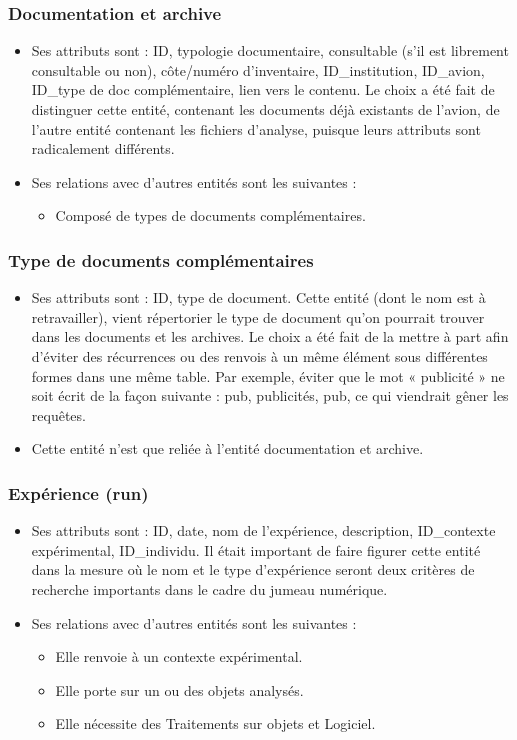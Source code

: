 \subsubsection{Documentation et archive}
\begin{itemize}
    \item Ses attributs sont : ID, typologie documentaire, consultable (s’il est librement consultable ou non), côte/numéro d’inventaire, ID\_institution, ID\_avion, ID\_type de doc complémentaire, lien vers le contenu. Le choix a été fait de distinguer cette entité, contenant les documents déjà existants de l’avion, de l’autre entité contenant les fichiers d’analyse, puisque leurs attributs sont radicalement différents.
    \item Ses relations avec d’autres entités sont les suivantes :
    \begin{itemize}
        \item Composé de types de documents complémentaires.
    \end{itemize}
\end{itemize}
\subsubsection{Type de documents complémentaires}
\begin{itemize}
    \item Ses attributs sont : ID, type de document. Cette entité (dont le nom est à retravailler), vient répertorier le type de document qu’on pourrait trouver dans les documents et les archives. Le choix a été fait de la mettre à part afin d’éviter des récurrences ou des renvois à un même élément sous différentes formes dans une même table. Par exemple, éviter que le mot « publicité » ne soit écrit de la façon suivante : pub, publicités, pub, ce qui viendrait gêner les requêtes.
    \item Cette entité n’est que reliée à l’entité documentation et archive.
\end{itemize}
\subsubsection{Expérience (run)}
\begin{itemize}
    \item Ses attributs sont : ID, date, nom de l'expérience, description, ID\_contexte expérimental, ID\_individu. Il était important de faire figurer cette entité dans la mesure où le nom et le type d’expérience seront deux critères de recherche importants dans le cadre du jumeau numérique.
    \item Ses relations avec d’autres entités sont les suivantes :
    \begin{itemize}
        \item Elle renvoie à un contexte expérimental.
        \item Elle porte sur un ou des objets analysés.
        \item Elle nécessite des Traitements sur objets et Logiciel.
    \end{itemize}
\end{itemize}
